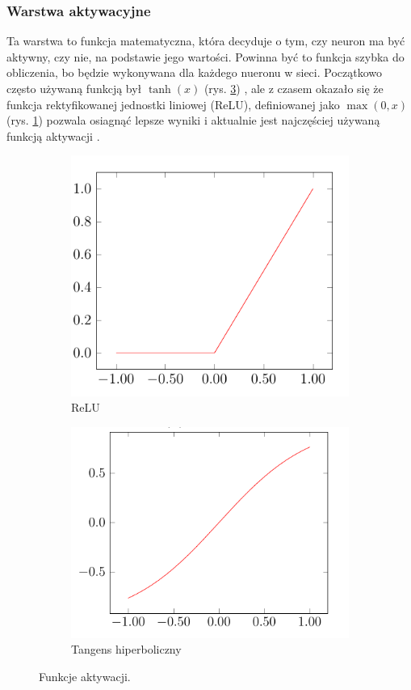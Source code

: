 \documentclass[a4paper,twoside,12pt]{book}
\begin{document}
{\subsubsection{Warstwa aktywacyjne}
{Ta warstwa to funkcja matematyczna, która decyduje o tym, czy neuron ma być aktywny, czy nie, na podstawie jego wartości. Powinna być to funkcja szybka do obliczenia, bo będzie wykonywana dla każdego nueronu w sieci. Początkowo często używaną funkcją był $\tanh(x)$ (rys. \ref {tanh}) , ale z czasem okazało się że funkcja rektyfikowanej jednostki liniowej (ReLU), definiowanej jako $\max(0,x)$(rys. \ref{ReLu}) pozwala osiagnąć lepsze wyniki \cite{nair2010rectified}\cite{glorot2011deep} i aktualnie jest najczęściej używaną funkcją aktywacji \cite{ramachandran2017searching}.}



\begin{figure}
\centering
\begin{subfigure}{.5\textwidth}
  \centering
  \includegraphics[width=.8\linewidth]{relu.png}
  \caption{ReLU}
  \label{ReLu}
\end{subfigure}%
\begin{subfigure}{.5\textwidth}
  \centering
  \includegraphics[width=.8\linewidth]{tanges.png}
  \caption{Tangens hiperboliczny}
  \label{tanh}
\end{subfigure}
\caption{Funkcje aktywacji.}
\end{figure}


}
\end{document}
